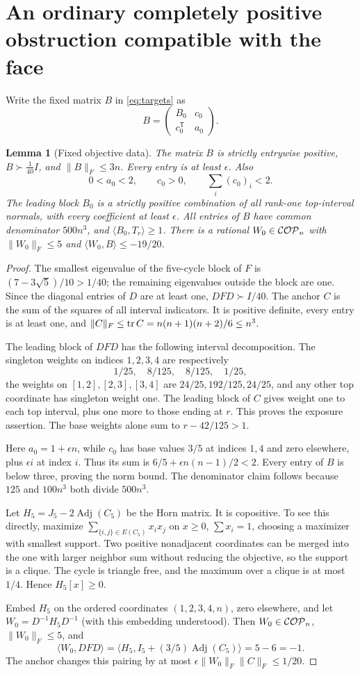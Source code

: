 \documentclass[11pt]{article}
\newtheorem{lemma}[theorem]{Lemma}
\theoremstyle{remark}\newtheorem{remark}[theorem]{Remark}
\newcommand{\ip}[2]{\langle #1,#2\rangle}\newcommand{\trans}{^{\mathsf T}}
\newcommand{\norm}[1]{\lVert #1\rVert}
\begin{document}
\section{An ordinary completely positive obstruction compatible with the face}
Write the fixed matrix $B$ in \eqref{eq:targets} as
\[
 B=\begin{pmatrix}B_0&c_0\\c_0\trans&a_0\end{pmatrix}.
\]
\begin{lemma}[Fixed objective data]\label{lem:data}
The matrix $B$ is strictly entrywise positive, $B\succ\frac1{40}I$, and $\norm B_F\le3n$. Every entry is at least $\epsilon$. Also
\[
 0<a_0<2,\qquad c_0>0,\qquad \sum_i(c_0)_i<2.
\]
The leading block $B_0$ is a strictly positive combination of all rank-one top-interval normals, with every coefficient at least $\epsilon$. All entries of $B$ have common denominator $500n^3$, and $\ip{B_0}{T_r}\ge1$.
There is a rational $W_0\in\mathcal{COP}_n$ with $\norm{W_0}_F\le5$ and $\ip{W_0}B\le-19/20$.
\end{lemma}
\begin{proof}
The smallest eigenvalue of the five-cycle block of $F$ is $(7-3\sqrt5)/10>1/40$; the remaining eigenvalues outside the block are one. Since the diagonal entries of $D$ are at least one, $DFD\succ I/40$. The anchor $C$ is the sum of the squares of all interval indicators. It is positive definite, every entry is at least one, and $\norm C_F\le\tr C=n(n+1)(n+2)/6\le n^3$.

The leading block of $DFD$ has the following interval decomposition. The singleton weights on indices $1,2,3,4$ are respectively
\[
 1/25,\quad8/125,\quad8/125,\quad1/25,
\]
the weights on $[1,2],[2,3],[3,4]$ are $24/25,192/125,24/25$, and any other top coordinate has singleton weight one. The leading block of $C$ gives weight one to each top interval, plus one more to those ending at $r$. This proves the exposure assertion. The base weights alone sum to $r-42/125>1$.

Here $a_0=1+\epsilon n$, while $c_0$ has base values $3/5$ at indices $1,4$ and zero elsewhere, plus $\epsilon i$ at index $i$. Thus its sum is $6/5+\epsilon n(n-1)/2<2$. Every entry of $B$ is below three, proving the norm bound. The denominator claim follows because $125$ and $100n^3$ both divide $500n^3$.

Let $H_5=J_5-2\operatorname{Adj}(C_5)$ be the Horn matrix. It is copositive. To see this directly, maximize $\sum_{\{i,j\}\in E(C_5)}x_ix_j$ on $x\ge0$, $\sum x_i=1$, choosing a maximizer with smallest support. Two positive nonadjacent coordinates can be merged into the one with larger neighbor sum without reducing the objective, so the support is a clique. The cycle is triangle free, and the maximum over a clique is at most $1/4$. Hence $H_5[x]\ge0$.

Embed $H_5$ on the ordered coordinates $(1,2,3,4,n)$, zero elsewhere, and let $W_0=D^{-1}H_5D^{-1}$ (with this embedding understood). Then $W_0\in\mathcal{COP}_n$, $\norm{W_0}_F\le5$, and
\[
 \ip{W_0}{DFD}=\ip{H_5}{I_5+(3/5)\operatorname{Adj}(C_5)}=5-6=-1.
\]
The anchor changes this pairing by at most $\epsilon\norm{W_0}_F\norm C_F\le1/20$.
\end{proof}
\end{document}
